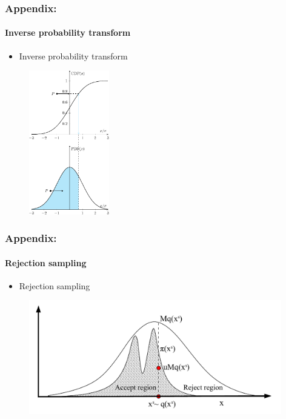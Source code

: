 \begin{frame}
\frametitle{Appendix:}
\framesubtitle{Inverse probability transform}
\begin{itemize}
    \item Inverse probability transform
\end{itemize}
\begin{figure}[ht]
    \includegraphics[width = 35mm]{figures/figure-CDF.pdf}
\end{figure}
\end{frame}

\begin{frame}
\frametitle{Appendix:}
\framesubtitle{Rejection sampling}
\begin{itemize}
    \item Rejection sampling
\end{itemize}
\begin{figure}[ht]
    \includegraphics[width = 110mm]{figures/figure-rejectionsampling.pdf}
\end{figure}
\end{frame}

